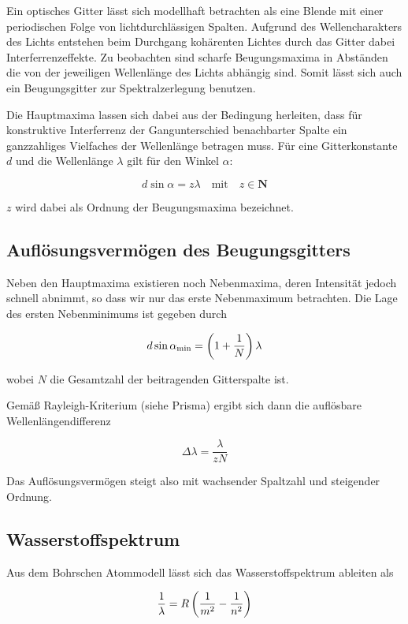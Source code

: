 \documentclass[a4paper,german,12pt,smallheadings]{scrartcl}
\begin{document}
Ein optisches Gitter lässt sich modellhaft betrachten als eine Blende mit einer
periodischen Folge von lichtdurchlässigen Spalten. Aufgrund des
Wellencharakters des Lichts entstehen beim Durchgang kohärenten Lichtes durch
das Gitter dabei Interferrenzeffekte. Zu beobachten sind scharfe Beugungsmaxima
in Abständen die von der jeweiligen Wellenlänge des Lichts abhängig sind. Somit
lässt sich auch ein Beugungsgitter zur Spektralzerlegung benutzen.

Die Hauptmaxima lassen sich dabei aus der Bedingung herleiten, dass für
konstruktive Interferrenz der Gangunterschied benachbarter Spalte ein
ganzzahliges Vielfaches der Wellenlänge betragen muss. Für eine Gitterkonstante
$d$ und die Wellenlänge $\lambda$ gilt für den Winkel $\alpha$:

\begin{equation}
  d \sin \alpha = z \lambda \quad \text{mit} \quad z \in \mathbf{N}
\end{equation}

$z$ wird dabei als Ordnung der Beugungsmaxima bezeichnet.

\subsection{Auflösungsvermögen des Beugungsgitters}

Neben den Hauptmaxima existieren noch Nebenmaxima, deren Intensität jedoch
schnell abnimmt, so dass wir nur das erste Nebenmaximum betrachten. Die Lage
des ersten Nebenminimums ist gegeben durch

\begin{equation}
  d \sin \alpha_\text{min} = \del{1 + \frac{1}{N}} \lambda
\end{equation}

wobei $N$ die Gesamtzahl der beitragenden Gitterspalte ist.

Gemäß Rayleigh-Kriterium (siehe Prisma) ergibt sich dann die auflösbare
Wellenlängendifferenz

\begin{equation}
  \Delta \lambda = \frac{\lambda}{z N}
\end{equation}

Das Auflösungsvermögen steigt also mit wachsender Spaltzahl und steigender Ordnung.

\subsection{Wasserstoffspektrum}

Aus dem Bohrschen Atommodell lässt sich das Wasserstoffspektrum ableiten als

\begin{equation}
  \frac{1}{\lambda} = R \del{ \frac{1}{m^2} - \frac{1}{n^2}}
\end{equation}

\end{document}
